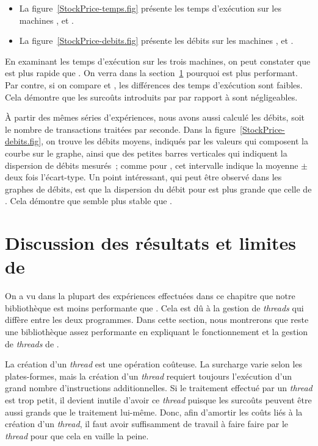 \begin{itemize}

\item La figure~\ref{StockPrice-temps.fig} pr\'esente les temps d'ex\'ecution sur les machines ,  et .

\item La figure~\ref{StockPrice-debits.fig} pr\'esente les d\'ebits sur les machines ,  et .

\end{itemize}


En examinant les temps d'ex\'ecution sur les trois machines, on peut constater que  est plus rapide que . On verra dans la section~\ref{limitesppff.sect} pourquoi  est plus performant. Par contre, si on compare  et , les diff\'erences des temps d'ex\'ecution sont faibles. Cela d\'emontre que les surco\^uts introduits par  par rapport \`a  sont négligeables.

\`A partir des m\^emes s\'eries d'exp\'eriences, nous avons aussi calcul\'e les d\'ebits, soit le nombre de transactions trait\'ees par seconde. Dans la figure~\ref{StockPrice-debits.fig}, on trouve les d\'ebits moyens, indiqués par les valeurs qui composent la courbe sur le graphe, ainsi que des petites barres verticales qui indiquent la dispersion de débits mesurés~; comme pour , cet intervalle indique la moyenne $\pm$ deux fois l'écart-type. Un point int\'eressant, qui peut \^etre observ\'e dans les graphes de d\'ebits, est que la dispersion du d\'ebit pour  est plus grande que celle de . Cela d\'emontre que  semble plus stable que . 

\section{Discussion des résultats et limites de \ppff}
\label{limitesppff.sect}

On a vu dans la plupart des exp\'eriences effectu\'ees dans ce chapitre que notre biblioth\`eque  est moins performante que . Cela est d\^u \`a la gestion de \emph{threads} qui diff\`ere entre les deux programmes. Dans cette section, nous montrerons que  reste une biblioth\`eque assez performante en expliquant le fonctionnement et la gestion de \emph{threads} de . 

La cr\'eation d'un \emph{thread} est une opération co\^uteuse. La surcharge varie selon les plates-formes, mais la cr\'eation d'un \emph{thread} requiert toujours l'exécution d'un grand nombre d'instructions additionnelles. Si le traitement effectué par un \emph{thread} est trop petit, il devient inutile d'avoir ce \emph{thread} puisque les surcoûts peuvent être aussi grands que le traitement lui-même. Donc, afin d'amortir les co\^uts li\'es \`a la cr\'eation d'un \emph{thread}, il faut avoir suffisamment de travail à faire faire par le \emph{thread} pour que cela en vaille la peine.

